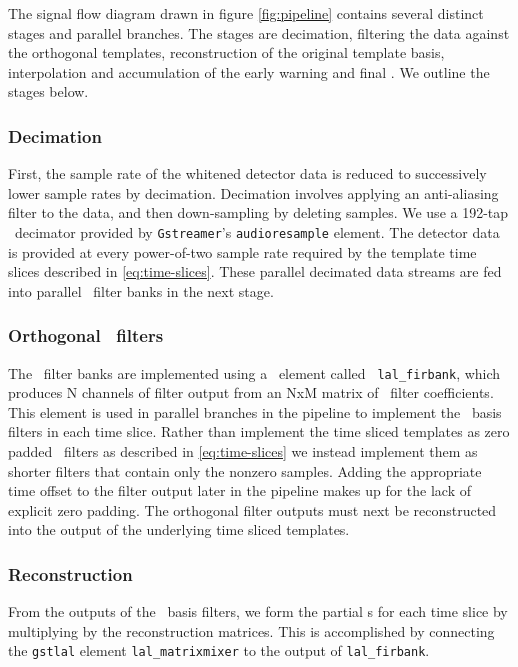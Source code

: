 The signal flow diagram drawn in figure \ref{fig:pipeline} contains several
distinct stages and parallel branches.  The stages are decimation, filtering
the data against the orthogonal templates, reconstruction of the original template basis, interpolation
and accumulation of the early warning and final {\SNR}.  We outline the stages
below. 

\subsubsection{Decimation}

First, the sample rate of the whitened detector data is reduced to successively
lower sample rates by decimation.  Decimation involves applying an anti-aliasing
filter to the data, and then down-sampling by deleting samples.  We use a
192-tap \fir\ decimator provided by {\tt Gstreamer}'s {\tt audioresample}
element.  The detector data is provided at every power-of-two sample rate
required by the template time slices described in \eqref{eq:time-slices}.  These
parallel decimated data streams are fed into parallel \fir\ filter banks in the
next stage.

\subsubsection{Orthogonal \fir\ filters}

The \fir\ filter banks are implemented using a \gstlal\ element called {\tt
lal\_firbank}, which produces N channels of filter output from an NxM matrix of
\fir\ filter coefficients.  This element is used in parallel branches in the
pipeline to implement the \SVD\ basis filters in each time
slice.  Rather than implement the time sliced templates as zero padded \fir\
filters as described in \eqref{eq:time-slices} we instead implement them as shorter
filters that contain only the nonzero samples.  Adding the appropriate time
offset to the filter output later in the pipeline makes up for the lack of
explicit zero padding.  The orthogonal filter outputs must next be reconstructed
into the output of the underlying time sliced templates. 

\subsubsection{Reconstruction}

From the outputs of the \SVD\ basis filters, we form the partial \SNR{}s for each time 
slice by multiplying by the reconstruction matrices.  This is accomplished by connecting 
the \texttt{gstlal} element \texttt{lal\_matrixmixer} to the output of
\texttt{lal\_firbank}.

